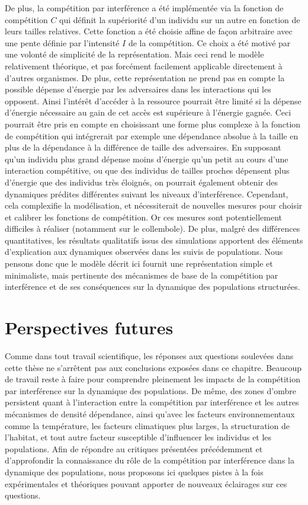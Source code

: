 De plus, la compétition par interférence a été implémentée via la fonction de
compétition $C$ qui définit la supériorité d'un individu sur un autre en
fonction de leurs tailles relatives. Cette fonction a été choisie affine de
façon arbitraire avec une pente définie par l'intensité $I$ de la
compétition. Ce choix a été motivé par une volonté de simplicité de la
représentation. Mais ceci rend le modèle relativement théorique, et pas
forcément facilement applicable directement à d'autres organismes. De plus,
cette représentation ne prend pas en compte la possible dépense d'énergie par les
adversaires dans les interactions qui les opposent. Ainsi l'intérêt d'accéder à
la ressource pourrait être limité si la dépense d'énergie nécessaire au gain de
cet accès est supérieure à l'énergie gagnée. Ceci pourrait être pris en compte
en choisissant une forme plus complexe à la fonction de compétition qui
intégrerait par exemple une dépendance absolue à la taille en plus de la
dépendance à la différence de taille des adversaires. En supposant qu'un
individu plus grand dépense moins d'énergie qu'un petit au cours d'une
interaction compétitive, ou que des individus de tailles proches dépensent plus
d'énergie que des individus très éloignés, on pourrait également obtenir des dynamiques prédites différentes suivant les
niveaux d'interférence. Cependant, cela complexifie la modélisation, et
nécessiterait de nouvelles mesures pour choisir et calibrer les fonctions de
compétition. Or ces mesures sont potentiellement difficiles à réaliser
(notamment sur le collembole). De plus, malgré des différences quantitatives, les résultats
qualitatifs issus des simulations apportent des éléments d'explication aux
dynamiques observées dans les suivis de populations.
Nous pensons donc que le modèle décrit ici fournit une représentation simple et
minimaliste, mais pertinente des mécanismes de base de la compétition par
interférence et de ses conséquences sur la dynamique des populations
structurées.

\section{Perspectives futures}

Comme dans tout travail scientifique, les réponses aux questions soulevées dans
cette thèse ne s'arrêtent pas aux conclusions exposées dans ce chapitre.
Beaucoup de travail reste à faire pour comprendre pleinement les impacts de la
compétition par interférence sur la dynamique des populations. De même, des
zones d'ombre persistent quant à l'interaction entre la compétition par
interférence et les autres mécanismes de densité dépendance, ainsi qu'avec les
facteurs environnementaux comme la température, les facteurs climatiques plus
larges, la structuration de l'habitat, et tout autre facteur susceptible
d'influencer les individus et les populations. Afin de répondre au critiques
présentées précédemment et d'approfondir la connaissance du rôle de la
compétition par interférence dans la dynamique des populations, nous proposons
ici quelques pistes à la fois expérimentales et théoriques pouvant apporter de
nouveaux éclairages sur ces questions.

